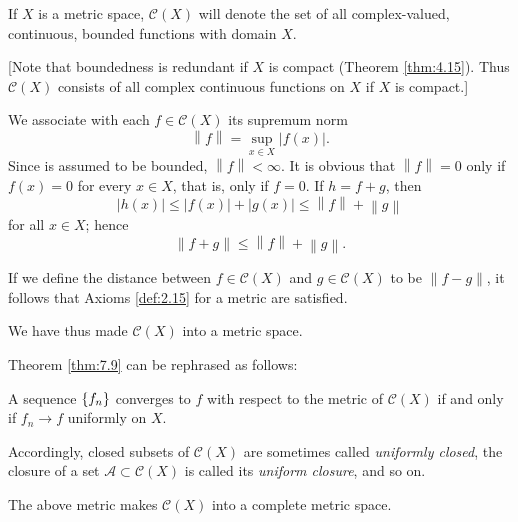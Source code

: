 \begin{mydef}
    \label{def:7.14}
    If $X$ is a metric space, $\mathscr{C}(X)$ will denote the set of all complex-valued, continuous, bounded functions with domain $X$.

    [Note that boundedness is redundant if $X$ is compact (Theorem \ref{thm:4.15}). 
    Thus $\mathscr{C}(X)$ consists of all complex continuous functions on $X$ if $X$ is compact.]

    We associate with each $f \in \mathscr{C}(X)$ its supremum norm
    \begin{equation*}
        \left\| f \right\| = \sup_{x \in X} \left| f(x) \right| .
    \end{equation*}
    Since 
    is assumed to be bounded, $\left\| f \right\| < \infty $. 
    It is obvious that $\left\| f \right\| = 0$ only if
    $f(x) = 0$ for every $x \in X$, 
    that is, only if $f = 0$. 
    If $h =f + g$, then
    \begin{equation*}
        \left| h(x) \right| \leq 
        \left| f(x) \right| + \left| g(x) \right| \leq
        \left\| f \right\| + \left\| g \right\| 
    \end{equation*}
    for all $x \in X$; hence
    \begin{equation*}
        \left\| f + g \right\| \leq
        \left\| f \right\| + \left\| g \right\| .
    \end{equation*}

    If we define the distance between $f \in \mathscr{C}(X)$ and $g \in \mathscr{C}(X)$ to be $\left\| f - g \right\| $,
    it follows that Axioms \ref{def:2.15} for a metric are satisfied.

    We have thus made $\mathscr{C}(X)$ into a metric space.
    
    Theorem \ref{thm:7.9} can be rephrased as follows:
    
    A sequence $\protect\{f_n\}$ converges to $f$ with respect to the metric of $\mathscr{C}(X)$ if and only if $f_n \rightarrow f$ uniformly on $X$.
    
    Accordingly, closed subsets of $\mathscr{C}(X)$ are sometimes called \emph{uniformly closed}, 
    the closure of a set $\mathscr{A} \subset \mathscr{C}(X)$ is called its \emph{uniform closure}, and so on.
\end{mydef}

\begin{thm}
    \label{thm:7.15}
    The above metric makes $\mathscr{C}(X)$ into a complete metric space.
\end{thm}


